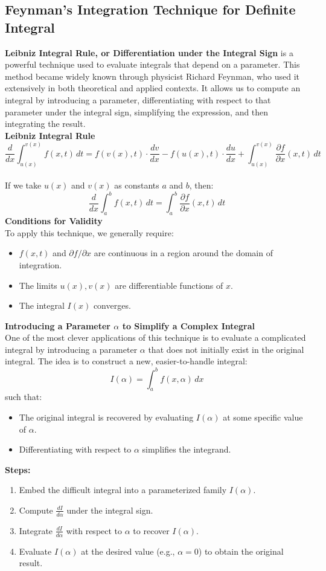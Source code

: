 \documentclass[11pt]{article}
\begin{document}
\subsection{Feynman's Integration Technique for Definite Integral}
\textbf{Leibniz Integral Rule, or Differentiation under the Integral Sign} is a powerful technique used to evaluate integrals that depend on a parameter. This method became widely known through physicist Richard Feynman, who used it extensively in both theoretical and applied contexts.
It allows us to compute an integral by introducing a parameter, differentiating with respect to that parameter under the integral sign, simplifying the expression, and then integrating the result.\\[.5em]
\textbf{Leibniz Integral Rule}
\[
    \frac{d}{dx} \int_{u(x)}^{v(x)} f(x, t) \, dt
    = f(v(x), t) \cdot \frac{dv}{dx} - f(u(x), t) \cdot \frac{du}{dx} 
    + \int_{u(x)}^{v(x)} \frac{\partial f}{\partial x}(x, t) \, dt
\]\\[.5em]
If we take $u(x)$ and $v(x)$ as constants $a$ and $b$, then:
\[
    \boxed{
        \frac{d}{dx} \int_a^b f(x, t) \, dt = \int_a^b \frac{\partial f}{\partial x}(x, t) \, dt
    }
\]
\textbf{Conditions for Validity}\\
To apply this technique, we generally require:
\begin{itemize}
    \item $f(x, t)$ and $\partial f / \partial x$ are continuous in a region around the domain of integration.
    \item The limits $u(x), v(x)$ are differentiable functions of $x$.
    \item The integral $I(x)$ converges.
\end{itemize}
\textbf{Introducing a Parameter $\alpha$ to Simplify a Complex Integral}\\
One of the most clever applications of this technique is to evaluate a complicated integral by introducing a parameter \(\alpha\) that does not initially exist in the original integral. The idea is to construct a new, easier-to-handle integral:
\[
    I(\alpha) = \int_{a}^{b} f(x, \alpha) \, dx
\]
such that:
\begin{itemize}
    \item The original integral is recovered by evaluating $I(\alpha)$ at some specific value of \(\alpha\).
    \item Differentiating with respect to $\alpha$ simplifies the integrand.
\end{itemize}
\textbf{Steps:}
\begin{enumerate}
    \item Embed the difficult integral into a parameterized family $I(\alpha)$.
    \item Compute $\displaystyle\frac{dI}{d\alpha}$ under the integral sign.
    \item Integrate $\displaystyle\frac{dI}{d\alpha}$ with respect to $\alpha$ to recover $I(\alpha)$.
    \item Evaluate $I(\alpha)$ at the desired value (e.g., $\alpha = 0$) to obtain the original result.
\end{enumerate}
\end{document}

